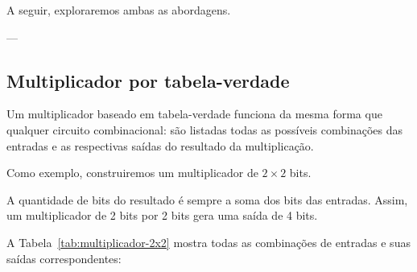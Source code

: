 \documentclass[12pt]{article}
\begin{document}
A seguir, exploraremos ambas as abordagens.

---

\subsection{Multiplicador por tabela-verdade}

Um multiplicador baseado em tabela-verdade funciona da mesma forma que qualquer circuito combinacional:  
são listadas todas as possíveis combinações das entradas e as respectivas saídas do resultado da multiplicação.

Como exemplo, construiremos um multiplicador de $2 \times 2$ bits.

\begin{tcolorbox}[mynote, title=\textbf{Lembre-se: número de bits da saída}]
A quantidade de bits do resultado é sempre a soma dos bits das entradas.  
Assim, um multiplicador de 2 bits por 2 bits gera uma saída de 4 bits.
\end{tcolorbox}

A Tabela~\ref{tab:multiplicador-2x2} mostra todas as combinações de entradas e suas saídas correspondentes:
\end{document}
